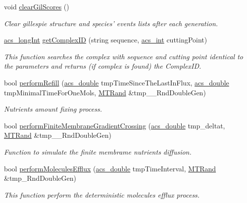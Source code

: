 \begin{DoxyCompactItemize}
void \hyperlink{a00011_aa33d7b81db9632c8ba1f9ce3f362df8e}{clear\-Gil\-Scores} ()
\begin{DoxyCompactList}\small\item\em Clear gillespie structure and species' events lists after each generation. \end{DoxyCompactList}\item 
\hyperlink{a00024_a19319d75f02db4308bc5c0026d98cd85}{acs\-\_\-long\-Int} \hyperlink{a00011_aa88b64fa5005973926a121f1aa46770d}{get\-Complex\-I\-D} (string sequence, \hyperlink{a00024_a8d277355641a098190360234e2ebde35}{acs\-\_\-int} cutting\-Point)
\begin{DoxyCompactList}\small\item\em This function searches the complex with sequence and cutting point identical to the parameters and returns (if complex is found) the Complex\-I\-D. \end{DoxyCompactList}\item 
bool \hyperlink{a00011_a8a53821ad1675b0da50591616aac3b74}{perform\-Refill} (\hyperlink{a00024_ab776853a005fcbf56af0424a2a4dd607}{acs\-\_\-double} tmp\-Time\-Since\-The\-Last\-In\-Flux, \hyperlink{a00024_ab776853a005fcbf56af0424a2a4dd607}{acs\-\_\-double} tmp\-Minimal\-Time\-For\-One\-Mols, \hyperlink{a00016}{M\-T\-Rand} \&tmp\-\_\-\-\_\-\-Rnd\-Double\-Gen)
\begin{DoxyCompactList}\small\item\em Nutrients amount fixing process. \end{DoxyCompactList}\item 
bool \hyperlink{a00011_ad714dd5a6f4bab1f418d3426216f4179}{perform\-Finite\-Membrane\-Gradient\-Crossing} (\hyperlink{a00024_ab776853a005fcbf56af0424a2a4dd607}{acs\-\_\-double} tmp\-\_\-deltat, \hyperlink{a00016}{M\-T\-Rand} \&tmp\-\_\-\-\_\-\-Rnd\-Double\-Gen)
\begin{DoxyCompactList}\small\item\em Function to simulate the finite membrame nutrients diffusion. \end{DoxyCompactList}\item 
bool \hyperlink{a00011_acbbcdb4c77231e9ffa4c169e0caa0d0c}{perform\-Molecules\-Efflux} (\hyperlink{a00024_ab776853a005fcbf56af0424a2a4dd607}{acs\-\_\-double} tmp\-Time\-Interval, \hyperlink{a00016}{M\-T\-Rand} \&tmp\-\_\-\-Rnd\-Double\-Gen)
\begin{DoxyCompactList}\small\item\em This function perform the deterministic molecules efflux process. \end{DoxyCompactList}\item 

\end{DoxyCompactItemize}
